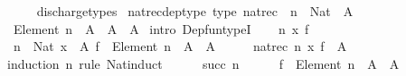 \begin{isabellebody}
\ \ \ \ \isamarkupfalse%
\ discharge{\isacharunderscore}{\kern0pt}types\isanewline
{}\isamarkupfalse%
%
\endisatagproof
{\isafoldproof}%
%
\isadelimproof
\isanewline
%
\endisadelimproof
\isanewline
{}\isamarkupfalse%
\ nat{\isacharunderscore}{\kern0pt}rec{\isacharprime}{\kern0pt}{\isacharunderscore}{\kern0pt}dep{\isacharunderscore}{\kern0pt}type\ {\isacharbrackleft}{\kern0pt}type{\isacharbrackright}{\kern0pt}{\isacharcolon}{\kern0pt}\ {\isachardoublequoteopen}nat{\isacharunderscore}{\kern0pt}rec{\isacharprime}{\kern0pt}\ {\isacharcolon}{\kern0pt}\ {\isacharparenleft}{\kern0pt}n\ {\isacharcolon}{\kern0pt}\ Nat{\isacharparenright}{\kern0pt}\ {\isasymRightarrow}\ A\ {\isasymRightarrow}\isanewline
\ \ {\isacharparenleft}{\kern0pt}Element\ {\isacharbrackleft}{\kern0pt}{}{\isacharcomma}{\kern0pt}{\isasymdots}{\isacharcomma}{\kern0pt}n{\isacharbrackright}{\kern0pt}\ {\isasymRightarrow}\ A\ {\isasymRightarrow}\ A{\isacharparenright}{\kern0pt}\ {\isasymRightarrow}\ A{\isachardoublequoteclose}\isanewline
%
\isadelimproof
%
\endisadelimproof
%
\isatagproof
{}\isamarkupfalse%
\ {\isacharparenleft}{\kern0pt}intro\ Dep{\isacharunderscore}{\kern0pt}fun{\isacharunderscore}{\kern0pt}typeI{\isacharparenright}{\kern0pt}{\isacharplus}{\kern0pt}\isanewline
\ \ \isamarkupfalse%
\ n\ x\ f\ \isamarkupfalse%
\ \ {\isachardoublequoteopen}n\ {\isacharcolon}{\kern0pt}\ Nat{\isachardoublequoteclose}\ {\isachardoublequoteopen}x\ {\isacharcolon}{\kern0pt}\ A{\isachardoublequoteclose}\ {\isachardoublequoteopen}f\ {\isacharcolon}{\kern0pt}\ Element\ {\isacharbrackleft}{\kern0pt}{}{\isacharcomma}{\kern0pt}{\isasymdots}{\isacharcomma}{\kern0pt}n{\isacharbrackright}{\kern0pt}\ {\isasymRightarrow}\ A\ {\isasymRightarrow}\ A{\isachardoublequoteclose}\isanewline
\ \ \isamarkupfalse%
\ \isamarkupfalse%
\ {\isachardoublequoteopen}nat{\isacharunderscore}{\kern0pt}rec{\isacharprime}{\kern0pt}\ n\ x\ f\ {\isacharcolon}{\kern0pt}\ A{\isachardoublequoteclose}\isanewline
\ \ \isamarkupfalse%
\ {\isacharparenleft}{\kern0pt}induction\ n\ rule{\isacharcolon}{\kern0pt}\ Nat{\isacharunderscore}{\kern0pt}induct{\isacharparenright}{\kern0pt}\isanewline
\ \ \ \ \isamarkupfalse%
\ {\isacharparenleft}{\kern0pt}succ\ n{\isacharparenright}{\kern0pt}\isanewline
\ \ \ \ \isamarkupfalse%
\ {\isachardoublequoteopen}f\ {\isacharcolon}{\kern0pt}\ Element\ {\isacharbrackleft}{\kern0pt}{}{\isacharcomma}{\kern0pt}{\isasymdots}{\isacharcomma}{\kern0pt}n{\isacharbrackright}{\kern0pt}\ {\isasymRightarrow}\ A\ {\isasymRightarrow}\ A{\isachardoublequoteclose}\isanewline

\end{isabellebody}
